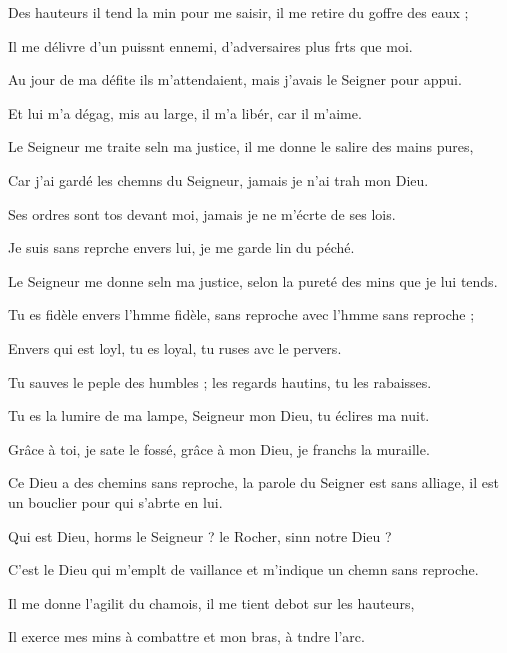 \item Des hauteurs il tend la min pour me saisir,\psstar{} il me retire du goffre des eaux ;
\item Il me délivre d’un puissnt ennemi,\psstar{} d’adversaires plus frts que moi.
\item Au jour de ma défite ils m’attendaient,\psstar{} mais j’avais le Seigner pour appui.
\item Et lui m’a dégag, mis au large,\psstar{} il m’a libér, car il m’aime.
\item Le Seigneur me traite seln ma justice,\psstar{} il me donne le salire des mains pures,
\item Car j’ai gardé les chemns du Seigneur,\psstar{} jamais je n’ai trah mon Dieu.
\item Ses ordres sont tos devant moi,\psstar{} jamais je ne m’écrte de ses lois.
\item Je suis sans reprche envers lui,\psstar{} je me garde lin du péché.
\item Le Seigneur me donne seln ma justice,\psstar{} selon la pureté des mins que je lui tends.
\item Tu es fidèle envers l’hmme fidèle,\psstar{} sans reproche avec l’hmme sans reproche ;
\item Envers qui est loyl, tu es loyal,\psstar{} tu ruses avc le pervers.
\item Tu sauves le peple des humbles ;\psstar{} les regards hautins, tu les rabaisses.
\item Tu es la lumire de ma lampe,\psstar{} Seigneur mon Dieu, tu éclires ma nuit.
\item Grâce à toi, je sate le fossé,\psstar{} grâce à mon Dieu, je franchs la muraille.
\item Ce Dieu a des chemins sans reproche,\pscross{} la parole du Seigner est sans alliage,\psstar{} il est un bouclier pour qui s’abrte en lui.
\item Qui est Dieu, horms le Seigneur ?\psstar{} le Rocher, sinn notre Dieu ?
\item C’est le Dieu qui m’emplt de vaillance\psstar{} et m’indique un chemn sans reproche.
\item Il me donne l’agilit du chamois,\psstar{} il me tient debot sur les hauteurs,
\item Il exerce mes mins à combattre\psstar{} et mon bras, à tndre l’arc.